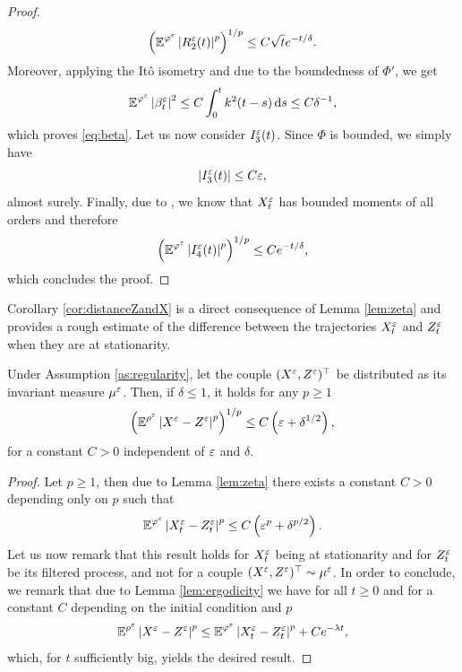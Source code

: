 \documentclass[10pt]{article}
\begin{document}
\begin{appendices}
\begin{proof}
	\begin{equation}
		\left( \operatorname{\mathbb{E}}^{\varphi^\varepsilon}\left\lvert R_2^\varepsilon(t)\right\rvert^p \right)^{1/p} \leq C \sqrt{t} e^{-t/\delta}.
	\end{equation}
	Moreover, applying the Itô isometry and due to the boundedness of $\Phi'$, we get
	\begin{equation}
	\operatorname{\mathbb{E}}^{\varphi^\varepsilon} \left\lvert\beta_t^\varepsilon\right\rvert^2 \le C \int_0^t k^2(t-s) \,\mathrm{d} s \leq C \delta^{-1},
	\end{equation}
	which proves \eqref{eq:beta}.
	Let us now consider $I_3^\varepsilon(t)$. Since $\Phi$ is bounded, we simply have
	\begin{equation}
	\left\lvert I_3^\varepsilon(t)\right\rvert \leq C \varepsilon, 
	\end{equation}
	almost surely. Finally, due to \cite[Corollary 5.4]{PaS07}, we know that $X_t^\varepsilon$ has bounded moments of all orders and therefore
	\begin{equation}
	\left(\operatorname{\mathbb{E}}^{\varphi^\varepsilon} \left\lvert I_4^\varepsilon(t)\right\rvert^p\right)^{1/p} \leq C e^{-t/\delta},
	\end{equation}
	which concludes the proof.
\end{proof}

Corollary \ref{cor:distanceZandX} is a direct consequence of Lemma \ref{lem:zeta} and provides a rough estimate of the difference between the trajectories $X_t^\varepsilon$ and $Z_t^\varepsilon$ when they are at stationarity.

\begin{corollary} \label{cor:distanceZandX} Under Assumption \ref{as:regularity}, let the couple $(X^\varepsilon, Z^\varepsilon)^\top$ be distributed as its invariant measure $\mu^\varepsilon$. Then, if $\delta \leq 1$, it holds for any $p \geq 1$
	\begin{equation}
	\left(\operatorname{\mathbb{E}}^{\rho^\varepsilon} \left\lvert X^\varepsilon - Z^\varepsilon\right\rvert^p\right)^{1/p} \leq C\left(\varepsilon + \delta^{1/2}\right),
	\end{equation}
	for a constant $C > 0$ independent of $\varepsilon$ and $\delta$.
\end{corollary}
\begin{proof}
	Let $p \geq 1$, then due to Lemma \ref{lem:zeta} there exists a constant $C > 0$ depending only on $p$ such that
	\begin{equation}
	\operatorname{\mathbb{E}}^{\varphi^\varepsilon}\left\lvert X_t^\varepsilon - Z_t^\varepsilon\right\rvert^p \leq C\left(\varepsilon^p + \delta^{p/2}\right).
	\end{equation}
	Let us now remark that this result holds for $X_t^\varepsilon$ being at stationarity and for $Z_t^\varepsilon$ be its filtered process, and not for a couple $(X^\varepsilon, Z^\varepsilon)^\top \sim \mu^\varepsilon$. In order to conclude, we remark that due to Lemma \ref{lem:ergodicity} we have for all $t \geq 0$ and for a constant $C$ depending on the initial condition and $p$  
	\begin{equation}
	\operatorname{\mathbb{E}}^{\rho^\varepsilon} \left\lvert X^\varepsilon - Z^\varepsilon\right\rvert^p \leq \operatorname{\mathbb{E}}^{\varphi^\varepsilon}\left\lvert X_t^\varepsilon - Z_t^\varepsilon\right\rvert^p + Ce^{-\lambda t},
	\end{equation}
	which, for $t$ sufficiently big, yields the desired result.
\end{proof}


\end{appendices}
\end{document}
